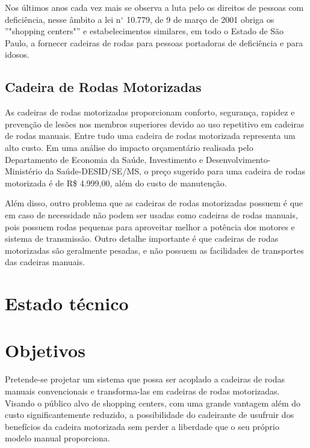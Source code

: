 Nos últimos anos cada vez mais se observa a luta pelo os direitos de pessoas com deficiência, nesse âmbito a lei n$^{\circ}$ 10.779, de 9 de março de 2001 obriga os ''"shopping centers"'' e estabelecimentos similares, em todo o Estado de São Paulo, a fornecer cadeiras de rodas para pessoas portadoras de deficiência e para idosos. 

\subsection{Cadeira de Rodas Motorizadas}

As cadeiras de rodas motorizadas proporcionam conforto, segurança, rapidez e prevenção de lesões nos membros superiores devido ao uso repetitivo em cadeiras de rodas manuais. Entre tudo uma cadeira de rodas motorizada representa um alto custo. Em uma análise do impacto orçamentário realisada pelo Departamento de Economia da Saúde, Investimento e Desenvolvimento- Ministério da Saúde-DESID/SE/MS, o preço sugerido para uma cadeira de rodas motorizada é de R\$ 4.999,00, além do custo de manutenção. \cite{relatorio_sus}

Além disso, outro problema que as cadeiras de rodas motorizadas possuem é que em caso de necessidade não podem ser usadas como cadeiras de rodas manuais, pois possuem rodas pequenas para aproveitar melhor a potência dos motores e sistema de transmissão. Outro detalhe importante é que cadeiras de rodas motorizadas são geralmente pesadas, e não possuem as facilidades de transportes das cadeiras manuais.

\section{Estado técnico}

\section{Objetivos}

Pretende-se projetar um sistema que possa ser acoplado a cadeiras de rodas manuais convencionais e transforma-las em cadeiras de rodas motorizadas. Visando o público alvo de shopping centers, com uma grande vantagem além do custo significantemente reduzido, a possibilidade do cadeirante de usufruir dos benefícios da cadeira motorizada sem perder a liberdade que o seu próprio modelo manual proporciona.
